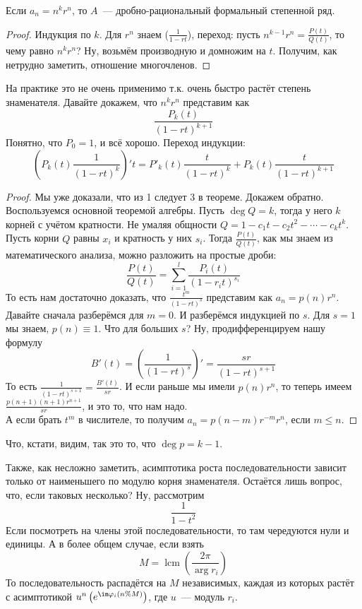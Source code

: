 \documentclass{article}
\begin{document}
    \begin{lemma}
        Если $a_n=n^kr^n$, то $A$~--- дробно-рациональный формальный степенной ряд.
    \end{lemma}
    \begin{proof}
        Индукция по $k$. Для $r^n$ знаем ($\frac1{1-rt}$), переход: пусть $n^{k-1}r^n=\frac{P(t)}{Q(t)}$, то чему равно $n^{k}r^n$? Ну, возьмём производную и домножим на $t$. Получим, как нетрудно заметить, отношение многочленов.
    \end{proof}
    \begin{remark}
        На практике это не очень применимо т.к. очень быстро растёт степень знаменателя. Давайте докажем, что $n^kr^n$ представим как
        $$
        \frac{P_k(t)}{(1-rt)^{k+1}}
        $$
        Понятно, что $P_0=1$, и всё хорошо. Переход индукции:
        $$
        \left(P_k(t)\frac1{(1-rt)^k}\right)'t=P'_k(t)\frac t{(1-rt)^k}+P_k(t)\frac t{(1-rt)^{k+1}}
        $$
    \end{remark}
    \begin{proof}
        Мы уже доказали, что из 1 следует 3 в теореме. Докажем обратно.\\
        Воспользуемся основной теоремой алгебры. Пусть $\deg Q=k$, тогда у него $k$ корней с учётом кратности. Не умаляя общности $Q=1-c_1t-c_2t^2-\cdots-c_kt^k$. Пусть корни $Q$ равны $x_i$ и кратность у них $s_i$. Тогда $\frac{P(t)}{Q(t)}$, как мы знаем из математического анализа, можно разложить на простые дроби:
        $$
        \frac{P(t)}{Q(t)}=\sum\limits_{i=1}^l\frac{P_i(t)}{(1-r_it)^{s_i}}
        $$
        То есть нам достаточно доказать, что $\frac{t^m}{(1-rt)^{s}}$ представим как $a_n=p(n)r^n$. Давайте сначала разберёмся для $m=0$. И разберёмся индукцией по $s$. Для $s=1$ мы знаем, $p(n)\equiv1$. Что для больших $s$? Ну, продифференцируем нашу формулу
        $$B'(t)=\left(\frac1{(1-rt)^{s}}\right)'=\frac{sr}{(1-rt)^{s+1}}$$
        То есть $\frac1{(1-rt)^{s+1}}=\frac{B'(t)}{sr}$. И если раньше мы имели $p(n)r^n$, то теперь имеем $\frac{p(n+1)(n+1)r^{n+1}}{sr}$, и это то, что нам надо.\\
        А если брать $t^m$ в числителе, то получим $a_n=p(n-m)r^{-m}r^n$, если $m\leqslant n$.
    \end{proof}
    \begin{remark}
        Что, кстати, видим, так это то, что $\deg p=k-1$.
    \end{remark}
    \begin{remark}
        Также, как несложно заметить, асимптотика роста последовательности зависит только от наименьшего по модулю корня знаменателя. Остаётся лишь вопрос, что, если таковых несколько? Ну, рассмотрим
        $$
        \frac1{1-t^2}
        $$
        Если посмотреть на члены этой последовательности, то там чередуются нули и единицы. А в более общем случае, если взять
        $$
        M=\operatorname{lcm}\left(\frac{2\pi}{\arg r_i}\right)
        $$
        То последовательность распадётся на $M$ независимых, каждая из которых растёт с асимптотикой $u^n\left(e^{\im\varphi_i(n\%M)}\right)$, где $u$~--- модуль $r_i$.
    \end{remark}
\end{document}
